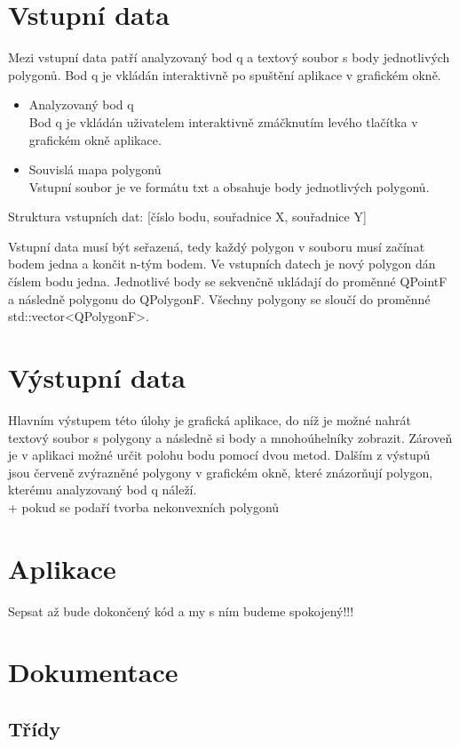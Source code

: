 \documentclass[a4paper, 12pt]{article}
\begin{document}
\section{Vstupní data}
Mezi vstupní data patří analyzovaný bod q a textový soubor s body jednotlivých polygonů. Bod q je vkládán interaktivně po spuštění aplikace v grafickém okně. 
\\
\begin{itemize}
\item Analyzovaný bod q\\
Bod q je vkládán uživatelem interaktivně zmáčknutím levého tlačítka v grafickém okně aplikace.

\item Souvislá mapa polygonů\\
Vstupní soubor je ve formátu txt a obsahuje body jednotlivých polygonů.
\end{itemize}

Struktura vstupních dat:
[číslo bodu, souřadnice X, souřadnice Y]

Vstupní data musí být seřazená, tedy každý polygon v souboru musí začínat bodem jedna a končit n-tým bodem.  Ve vstupních datech je nový polygon dán číslem bodu jedna. Jednotlivé body se sekvenčně ukládají do proměnné QPointF a následně polygonu do QPolygonF. Všechny polygony se sloučí do proměnné  std::vector<QPolygonF>.

\section{Výstupní data}
Hlavním výstupem této úlohy je grafická aplikace, do níž je možné nahrát textový soubor s polygony a následně si body a mnohoúhelníky zobrazit. Zároveň je v aplikaci možné určit polohu bodu pomocí dvou metod. Dalším z výstupů jsou červeně zvýrazněné polygony v grafickém okně, které znázorňují polygon, kterému analyzovaný bod q náleží.
\\
+ pokud se podaří tvorba nekonvexních polygonů

\section{Aplikace}
Sepsat až bude dokončený kód a my s ním budeme spokojený!!!

\section{Dokumentace}
\subsection{Třídy}
\end{document}
